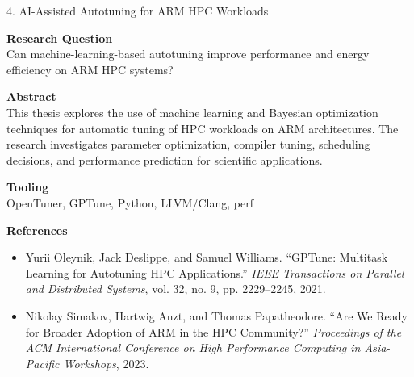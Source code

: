 \documentclass[aspectratio=169]{beamer}
\begin{document}
\begin{frame}{4. AI-Assisted Autotuning for ARM HPC Workloads}
\small

\textbf{Research Question}\\
Can machine-learning-based autotuning improve performance and energy efficiency on ARM HPC systems?

\vspace{0.35em}

\textbf{Abstract}\\
This thesis explores the use of machine learning and Bayesian optimization techniques for automatic tuning of HPC workloads on ARM architectures. The research investigates parameter optimization, compiler tuning, scheduling decisions, and performance prediction for scientific applications.

\vspace{0.35em}

\textbf{Tooling}\\
OpenTuner, GPTune, Python, LLVM/Clang, perf

\vspace{0.35em}

\textbf{References}
\begin{itemize}
\item Yurii Oleynik, Jack Deslippe, and Samuel Williams. ``GPTune: Multitask Learning for Autotuning HPC Applications.'' \emph{IEEE Transactions on Parallel and Distributed Systems}, vol. 32, no. 9, pp. 2229--2245, 2021.

\item Nikolay Simakov, Hartwig Anzt, and Thomas Papatheodore. ``Are We Ready for Broader Adoption of ARM in the HPC Community?'' \emph{Proceedings of the ACM International Conference on High Performance Computing in Asia-Pacific Workshops}, 2023.
\end{itemize}

\end{frame}

\end{document}
